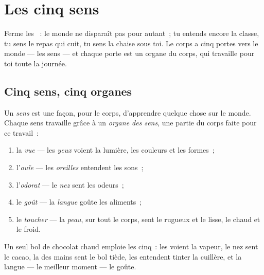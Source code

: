 \chapter{Les cinq sens}\label{ch:g1:the-five-senses}

Ferme les ~: le monde ne disparaît pas pour autant~; tu entends
encore la classe, tu sens le repas qui cuit, tu sens la chaise sous
toi. Le corps a cinq portes vers le monde --- les sens --- et
chaque porte est un organe du corps, qui travaille pour toi toute la
journée.

\section{Cinq sens, cinq organes}

\begin{definition}\label{def:g1:the-five-senses:sense}
Un \emph{sens} est une façon, pour le corps, d'apprendre
quelque chose sur le monde. Chaque sens travaille grâce à un
\emph{organe des sens}, une partie du corps
faite pour ce travail~:
\begin{enumerate}
  \item la \emph{vue} --- les \emph{yeux}
        voient la lumière, les couleurs et les formes~;
  \item l'\emph{ouïe} --- les \emph{oreilles}
        entendent les sons~;
  \item l'\emph{odorat} --- le \emph{nez}
        sent les odeurs~;
  \item le \emph{goût} --- la \emph{langue}
        goûte les aliments~;
  \item le \emph{toucher} --- la \emph{peau},
        sur tout le corps, sent le rugueux et le lisse, le chaud et
        le froid.
\end{enumerate}
\end{definition}

\begin{example}\label{ex:g1:the-five-senses:breakfast}
Un seul bol de chocolat chaud emploie les cinq~: les  voient la
vapeur, le nez sent le cacao, la  des mains sent le bol tiède,
les  entendent tinter la cuillère, et la langue --- le
meilleur moment --- le goûte.
\end{example}

